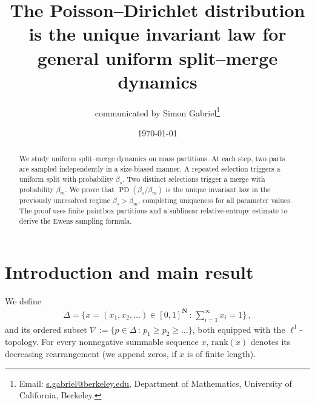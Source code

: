 \documentclass[a4paper,11pt]{article}
\title{The Poisson--Dirichlet distribution is the unique invariant law for general uniform split–merge dynamics}
\author{communicated by Simon Gabriel\footnote{Email: \href{mailto:s.gabriel@berkeley.edu}{s.gabriel@berkeley.edu},
Department of Mathematics, University of California, Berkeley.} }
\date{\today}
\newcommand{\NN}{\mathbf{N}}
\numberwithin{equation}{section}
\begin{document}
\maketitle

\begin{abstract}
	We study uniform split–merge dynamics on mass partitions. At each step, two parts are sampled independently in a size-biased manner. A repeated selection triggers a uniform split with probability \(\beta_s\). Two distinct selections trigger a merge with probability \(\beta_m\). We prove that \(\operatorname{PD}(\beta_s/\beta_m)\) is the unique invariant law in the previously unresolved regime \(\beta_s>\beta_m\), completing uniqueness for all parameter values. The proof uses finite paintbox partitions and a sublinear relative-entropy estimate to derive the Ewens sampling formula.
\end{abstract}






\section{Introduction and main result}


We define 
\begin{equation*}
\begin{aligned}
\Delta = \bigg\{ x  = ( x_{1}, x_{2}, \ldots) \in [0,1]^{\NN} \, :\,  \sum_{i=1}^\infty x_i = 1 \bigg\} \,,
\end{aligned}
\end{equation*}
and its ordered subset $ \nabla := \{ p \in \Delta \, : \, p_{1} \geq p_2 \geq \ldots \}$,
both equipped with the $ \ell^{1}$-topology. 
For every nonnegative summable sequence  $x$, $\mathrm{rank} (x)$ denotes its decreasing rearrangement (we append zeros, if $x$ is of finite length).
\end{document}

